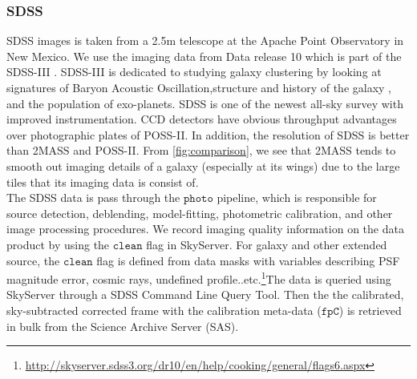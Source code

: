 \documentclass[5p]{elsarticle}
\begin{document}
	\subsubsection{SDSS}
	SDSS images is taken from a 2.5m telescope at the Apache Point Observatory in New Mexico. We use the imaging data from Data release 10 which is part of the SDSS-III . SDSS-III is dedicated to studying galaxy clustering by looking at signatures of Baryon Acoustic Oscillation,structure and history of the galaxy , and the population of exo-planets.  SDSS is  one of the newest all-sky survey with improved instrumentation. CCD detectors have obvious throughput advantages over photographic plates of POSS-II. In addition, the resolution of SDSS is better than 2MASS and POSS-II.  From \autoref{fig:comparison}, we see that 2MASS tends to smooth out imaging details of a galaxy (especially at its wings)  due to the large tiles that its imaging data is consist of.
\\
\indent The SDSS data is pass through the $\texttt{photo}$ pipeline, which is responsible for source detection, deblending, model-fitting, photometric calibration, and other image processing procedures. We record imaging quality information on the data product by using the $\texttt{clean}$ flag in SkyServer. For galaxy and other extended source, the $\texttt{clean}$ flag is defined from data masks with variables describing PSF magnitude error, cosmic rays, undefined profile..etc.\footnote{\url{http://skyserver.sdss3.org/dr10/en/help/cooking/general/flags6.aspx}}The data is queried using SkyServer through a SDSS Command Line Query Tool. Then the the calibrated, sky-subtracted corrected frame with the calibration meta-data ($\texttt{fpC}$) is retrieved in bulk from the Science Archive Server (SAS). 
\end{document}
